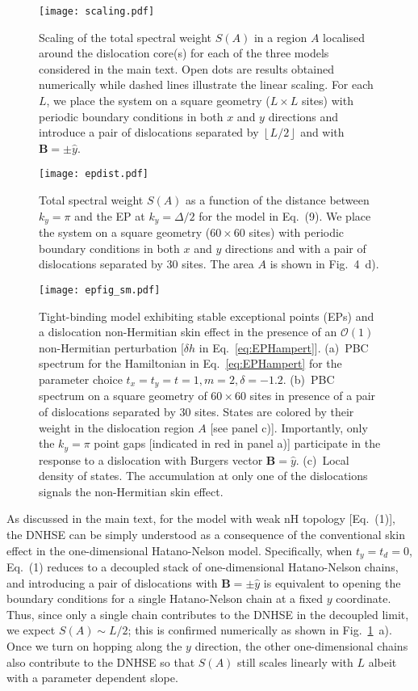 \documentclass[prb,reprint,twocolumn,preprintnumbers,amsmath,amssymb,showpacs,nofootinbib,superscriptaddress]{revtex4-2}
\newcommand{\bs}[1]{\boldsymbol{#1}}
\begin{document}
\begin{figure}[t]
    \centering
    \texttt{[image: scaling.pdf]}
    \caption{Scaling of the total spectral weight $S(A)$ in a region $A$ localised around the dislocation core(s) for each of the three models considered in the main text. Open dots are results obtained numerically while dashed lines illustrate the linear scaling. For each $L$, we place the system on a square geometry ($L \times L$ sites) with periodic boundary conditions in both $x$ and $y$ directions and introduce a pair of dislocations separated by $\left \lfloor{L/2}\right \rfloor$ and with $\bs{B} = \pm \hat{y}$.}
    \label{fig:scaling}
\end{figure}

\begin{figure}[t]
    \centering
    \texttt{[image: epdist.pdf]}
    \caption{Total spectral weight $S(A)$ as a function of the distance between $k_y = \pi$ and the EP at $k_y = \Delta/2$ for the model in Eq.~(9). We place the system on a square geometry ($60 \times 60$ sites) with periodic boundary conditions in both $x$ and $y$ directions and with a pair of dislocations separated by 30 sites. The area $A$ is shown in Fig.~4~d).}
    \label{fig:EPdist}
\end{figure}

\begin{figure}[t]
\centering
\texttt{[image: epfig\_sm.pdf]}
\caption{Tight-binding model exhibiting stable exceptional points (EPs) and a dislocation non-Hermitian skin effect in the presence of an $\mathcal{O}(1)$ non-Hermitian perturbation [$\delta h$ in Eq.~\eqref{eq:EPHampert}]. (a)~PBC spectrum for the Hamiltonian in Eq.~\eqref{eq:EPHampert} for the parameter choice $t_x=t_y=t=1,m=2,\delta = -1.2$. (b)~PBC spectrum on a square geometry of $60 \times 60$ sites in presence of a pair of dislocations separated by $30$ sites. States are colored by their weight in the dislocation region $A$ [see panel c)]. Importantly, only the $k_y = \pi$ point gaps [indicated in red in panel a)] participate in the response to a dislocation with Burgers vector $\bs{B} = \hat{y}$. (c)~Local density of states. The accumulation at only one of the dislocations signals the non-Hermitian skin effect.}
\label{fig:EPpert}
\end{figure}

As discussed in the main text, for the model with weak nH topology [Eq.~(1)], the DNHSE can be simply understood as a consequence of the conventional skin effect in the one-dimensional Hatano-Nelson model. Specifically, when $t_y = t_d = 0$, Eq.~(1) reduces to a decoupled stack of one-dimensional Hatano-Nelson chains, and introducing a pair of dislocations with $\bs{B} = \pm \hat{y}$ is equivalent to opening the boundary conditions for a single Hatano-Nelson chain at a fixed $y$ coordinate. Thus, since only a single chain contributes to the DNHSE in the decoupled limit, we expect $S(A) \sim L/2$; this is confirmed numerically as shown in Fig.~\ref{fig:scaling}~a). Once we turn on hopping along the $y$ direction, the other one-dimensional chains also contribute to the DNHSE so that $S(A)$ still scales linearly with $L$ albeit with a parameter dependent slope.
\end{document}
